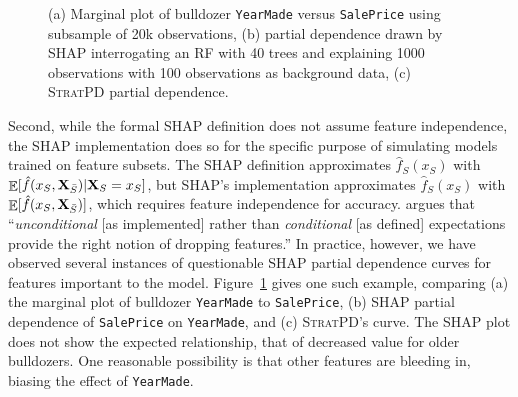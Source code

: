 \documentclass[11pt]{article}
\newcommand{\figref}[1]{Figure~\ref{#1}}
\DeclareMathOperator{\Ex}{\mathbb{E}}
\newcommand{\spd}{\fontfamily{cmr}\textsc{\small StratPD}}
\begin{document}
\begin{figure}[htbp]
\begin{center}
\caption{\small (a) Marginal plot of bulldozer {\tt YearMade} versus {\tt SalePrice} using subsample of 20k observations, (b) partial dependence drawn by SHAP interrogating an RF with 40 trees and explaining 1000 observations with 100 observations as background data, (c) \spd{} partial dependence.}
\label{fig:shap-stratpd-YearMade}
\end{center}
\end{figure}

Second, while the formal SHAP definition does not assume feature independence, the SHAP implementation does so for the specific purpose of simulating models trained on feature subsets. The SHAP definition approximates $\hat{f}_S(x_S)$ with $\Ex[\hat{f}(x_{S},{\bf X}_{\bar{S}}) | {\bf X}_S = x_S]$, but SHAP's implementation approximates $\hat{f}_S(x_S)$ with $\Ex[\hat{f}(x_{S},{\bf X}_{\bar{S}})]$, which requires feature independence for accuracy. \cite{janzing2019feature} argues that ``{\em unconditional} [as implemented] rather than {\em conditional} [as defined] expectations provide the right notion of dropping features.'' In practice, however, we have observed several instances of questionable SHAP partial dependence curves for features important to the model.  \figref{fig:shap-stratpd-YearMade} gives one such example, comparing (a) the marginal plot of  bulldozer {\tt YearMade} to {\tt SalePrice}, (b) SHAP partial dependence of {\tt SalePrice} on {\tt YearMade}, and (c) \spd{}'s curve. The SHAP plot does not show the expected relationship, that of decreased value for older bulldozers. One reasonable possibility is that other features are bleeding in, biasing the effect of {\tt YearMade}.
\end{document}
